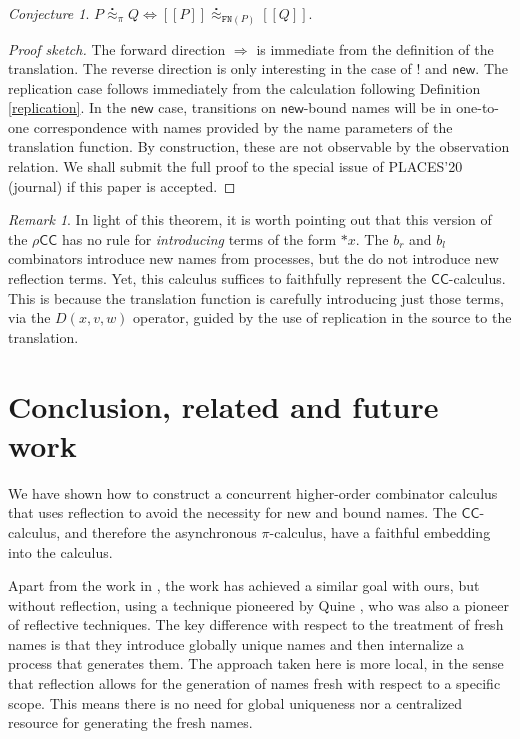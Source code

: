 \documentclass[submission,copyright,creativecommons]{eptcs}
\newcommand{\new}{\mathsf{new}}
\newcommand{\pic}{$\pi$-calculus}
\newcommand{\ccomb}{$\mathsf{CC}$-calculus}
\newcommand{\ldb}{[\![}
\newcommand{\rdb}{]\!]}
\newcommand{\wbbisim}{\stackrel{\centerdot}{\approx}} %
\newcommand{\dropn}[1]{\mathsf{*}#1}
\newcommand{\rhocc}{$\rho$$\mathsf{CC}$}
\theoremstyle{definition}
\theoremstyle{remark}
\newtheorem{remark}{Remark}
\theoremstyle{remark}
\newtheorem{conjecture}{Conjecture}
\begin{document}
\begin{conjecture} 
  $P \wbbisim_{\pi} Q \iff \ldb P \rdb \wbbisim_{\texttt{FN}(P)} \ldb Q \rdb$.
\end{conjecture}

\begin{proof}[Proof sketch]
  The forward direction $\Rightarrow$ is immediate from the definition
  of the translation. The reverse direction is only interesting in the
  case of $!$ and $\mathsf{new}$. The replication case follows immediately
  from the calculation following Definition \ref{replication}. 
  In the $\new$ case, transitions on $\mathsf{new}$-bound
  names will be in one-to-one correspondence with names provided by
  the name parameters of the translation function. By construction,
  these are not observable by the observation relation.
  We shall submit the full proof to the special issue of
  PLACES'20 (journal) if this paper is accepted.
\end{proof}

\begin{remark}
  In light of this theorem, it is worth pointing out that this version
  of the {\rhocc} has no rule for \emph{introducing} terms of
  the form $\dropn{x}$. The $b_r$ and $b_l$ combinators introduce new
  names from processes, but the do not introduce new reflection
  terms. Yet, this calculus suffices to faithfully represent the
  {\ccomb}. This is because the translation function is
  carefully introducing just those terms, via the $D(x,v,w)$ operator,
  guided by the use of replication in the source to the
  translation. 
\end{remark}

\section{Conclusion, related and future work}
We have shown how to construct a concurrent higher-order combinator
calculus that uses reflection to avoid the necessity for new and bound
names.  The {\ccomb}, and therefore the asynchronous {\pic}, have a
faithful embedding into the calculus.

Apart from the work in \cite{DBLP:conf/popl/HondaY94,DBLP:journals/tcs/Yoshida02},
the work \cite{DBLP:journals/toplas/RajaS97}
has achieved a similar goal with ours, but
without reflection, using a technique pioneered by Quine
\cite{Quine59,Quine60}, who was also a pioneer of reflective
techniques. The key difference with respect to the treatment of fresh
names is that they introduce globally unique names and then
internalize a process that generates them. The approach taken here is
more local, in the sense that reflection allows for the generation of
names fresh with respect to a specific scope. This means there is no
need for global uniqueness nor a centralized resource for generating
the fresh names.
\end{document}
